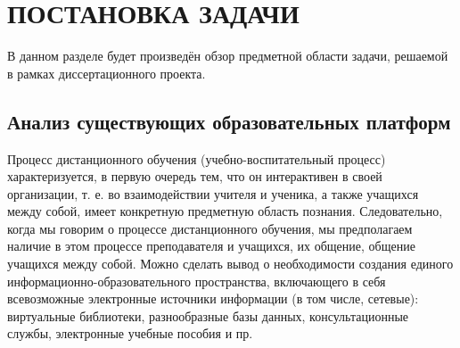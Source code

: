 \section{ПОСТАНОВКА ЗАДАЧИ}

В данном разделе будет произведён обзор предметной области задачи, решаемой в рамках диссертационного проекта.

\subsection{Анализ существующих образовательных платформ}

Процесс дистанционного обучения (учебно-воспитательный процесс) характеризуется, в первую очередь
тем, что он интерактивен в своей организации, т. е. во взаимодействии учителя и ученика, а
также учащихся между собой, имеет конкретную предметную область познания. Следовательно,
когда мы говорим о процессе дистанционного обучения, мы предполагаем наличие в этом процессе
преподавателя и учащихся, их общение, общение учащихся между собой. Можно сделать вывод о
необходимости создания единого информационно-образовательного пространства, включающего в
себя всевозможные электронные источники информации (в том числе, сетевые): виртуальные
библиотеки, разнообразные базы данных, консультационные службы, электронные учебные пособия и пр.
